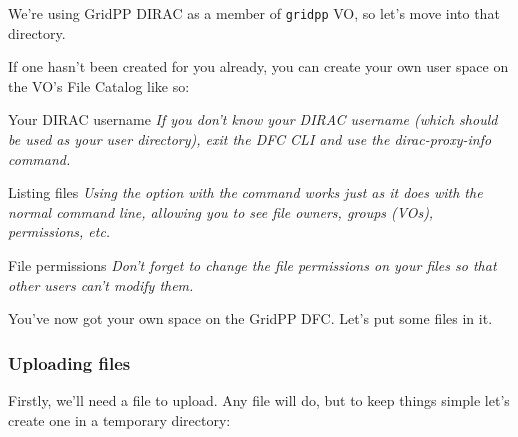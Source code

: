 We're using GridPP DIRAC as a member of \texttt{gridpp} VO, so let's
move into that directory.

\begin{Shaded}
\begin{Highlighting}[]
\NormalTok{:/}\KeywordTok{>} 
\end{Highlighting}
\end{Shaded}

If one hasn't been created for you already, you can create your own user
space on the VO's File Catalog like so:

\begin{Shaded}
\begin{Highlighting}[]
\KeywordTok{>} 
\KeywordTok{>} 
\KeywordTok{>} 
\KeywordTok{>} 
 
\KeywordTok{>} 
\end{Highlighting}
\end{Shaded}

\begin{infobox}{Your DIRAC username}
\emph{If you don't know your DIRAC username (which should be used as your user
directory), exit the DFC CLI and use the dirac-proxy-info command.}
\end{infobox}

\begin{infobox}{Listing files}
\emph{Using the}  \emph{option with the}
 \emph{command works just as it does with the
normal command line, allowing you to see file owners, groups (VOs),
permissions, etc.}
\end{infobox}

\begin{warningbox}{File permissions}
\emph{Don't forget to change the file permissions on your files so that other
users can't modify them.}
\end{warningbox}

You've now got your own space on the GridPP DFC. Let's put some files in
it.

\subsubsection{Uploading files}
\label{uploading-files}
Firstly, we'll need a file to upload. Any file will do, but to keep
things simple let's create one in a temporary directory:

